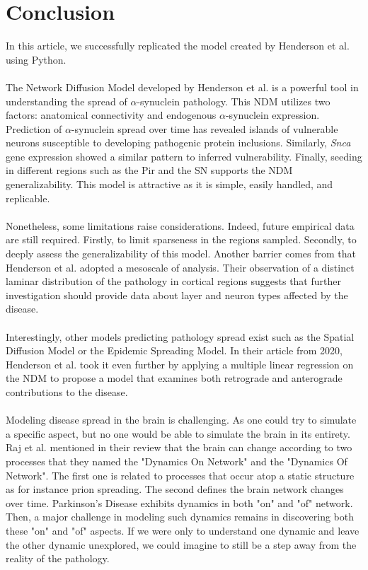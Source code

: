 \section{Conclusion}
In this article, we successfully replicated the model created by Henderson et al. using Python.\\
\\
The Network Diffusion Model developed by Henderson et al. is a powerful tool in understanding the spread of $\alpha$-synuclein pathology. This NDM utilizes two factors: anatomical connectivity and endogenous $\alpha$-synuclein expression. Prediction of $\alpha$-synuclein spread over time has revealed islands of vulnerable neurons susceptible to developing pathogenic protein inclusions. Similarly, \textit{Snca} gene expression showed a similar pattern to inferred vulnerability. Finally, seeding in different regions such as the Pir and the SN supports the NDM generalizability. This model is attractive as it is simple, easily handled, and replicable.\\
\\
Nonetheless, some limitations raise considerations. Indeed, future empirical data are still required. Firstly, to limit sparseness in the regions sampled. Secondly, to deeply assess the generalizability of this model. Another barrier comes from that Henderson et al. adopted a mesoscale of analysis. Their observation of a distinct laminar distribution of the pathology in cortical regions suggests that further investigation should provide data about layer and neuron types affected by the disease.\\
\\
Interestingly, other models predicting pathology spread exist such as the Spatial Diffusion Model \cite{Mezias_2020} or the Epidemic Spreading Model. \cite{Vogel_2020} In their article from 2020, Henderson et al. took it even further by applying a multiple linear regression on the NDM to propose a model that examines both retrograde and anterograde contributions to the disease. \cite{Henderson_2020_tau}\\
\\
Modeling disease spread in the brain is challenging. As one could try to simulate a specific aspect, but no one would be able to simulate the brain in its entirety. Raj et al. mentioned in their review that the brain can change according to two processes that they named the "Dynamics On Network" and the "Dynamics Of Network". The first one is related to processes that occur atop a static structure as for instance prion spreading. The second defines the brain network changes over time. Parkinson's Disease exhibits dynamics in both "on" and "of" network. \cite{Raj_2018} Then, a major challenge in modeling such dynamics remains in discovering both these "on" and "of" aspects. If we were only to understand one dynamic and leave the other dynamic unexplored, we could imagine to still be a step away from the reality of the pathology.
